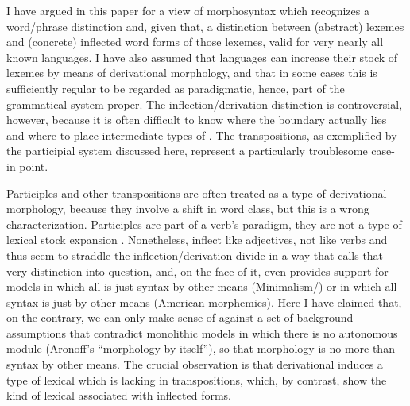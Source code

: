 \documentclass[output=paper,
modfonts
]{LSP/langsci}
\begin{document}
I have argued in this paper for a view of morphosyntax which recognizes a word/phrase distinction and, given that, a distinction between (abstract) lexemes and (concrete) inflected word forms of those lexemes, valid for very nearly all known languages. I have also assumed that languages can increase their stock of lexemes by means of derivational morphology, and that in some cases this is sufficiently regular to be regarded as  paradigmatic, hence, part of the grammatical system proper. The inflection/derivation distinction is controversial, however, because it is often difficult to know where the boundary actually lies and where to place intermediate types of . The transpositions, as exemplified by the  participial system discussed here, represent a particularly troublesome case-in-point.


Participles and other transpositions are often treated as a type of derivational morphology, because they involve a shift in word class, but this is a wrong characterization. Participles are part of a verb’s paradigm, they are not a type of lexical stock expansion \parencite{Beard95:book}. Nonetheless,  inflect like adjectives, not like verbs and thus seem to straddle the inflection/derivation divide in a way that calls that very distinction into question, and, on the face of it, even provides support for models in which all  is just syntax by other means (Minimalism/) or in which all syntax is just  by other means (American morphemics). Here I have claimed that, on the contrary, we can only make sense of  against a set of background assumptions that contradict  monolithic  models in which there is no autonomous  module (Aronoff's ``morphology-by-itself''), so that morphology is no more than syntax by other means. The crucial observation is that derivational  induces a type of lexical  which is lacking in transpositions, which, by contrast, show the kind of lexical  associated with inflected forms.
\end{document}
